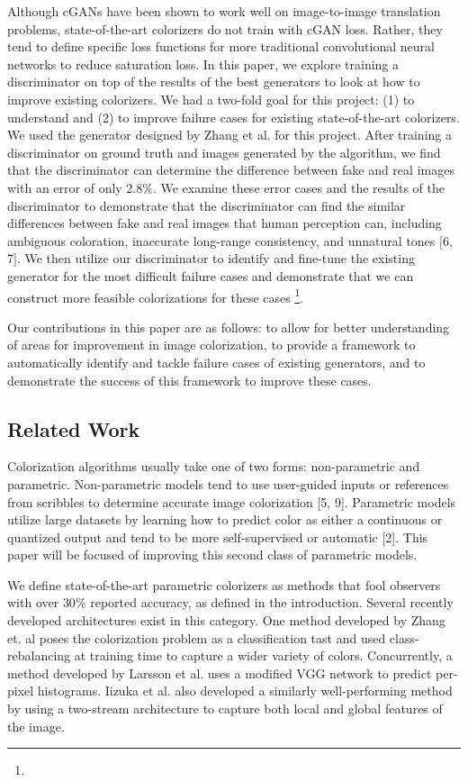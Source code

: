 \documentclass[10pt,twocolumn,letterpaper]{article}
\begin{document}
Although cGANs have been shown to work well on image-to-image translation problems, state-of-the-art colorizers do not train with cGAN loss. Rather, they tend to define specific loss functions for more traditional convolutional neural networks to reduce saturation loss. In this paper, we explore training a discriminator on top of the results of the best generators to look at how to improve existing colorizers. We had a two-fold goal for this project: (1) to understand and (2) to improve failure cases for existing state-of-the-art colorizers. We used the generator designed by Zhang et al. for this project. After training a discriminator on ground truth and images generated by the algorithm, we find that the discriminator can determine the difference between fake and real images with an error of only $2.8\%$. We examine these error cases and the results of the discriminator to demonstrate that the discriminator can find the similar differences between fake and real images that human perception can, including ambiguous coloration, inaccurate long-range consistency, and unnatural tones [6, 7]. We then utilize our discriminator to identify and fine-tune the existing generator for the most difficult failure cases and demonstrate that we can construct more feasible colorizations for these cases \footnote{}.

Our contributions in this paper are as follows: to allow for better understanding of areas for improvement in image colorization, to provide a framework to automatically identify and tackle failure cases of existing generators, and to demonstrate the success of this framework to improve these cases. 

\subsection{Related Work}

Colorization algorithms usually take one of two forms: non-parametric and parametric. Non-parametric models tend to use user-guided inputs or references from scribbles to determine accurate image colorization [5, 9]. Parametric models utilize large datasets by learning how to predict color as either a continuous or quantized output and tend to be more self-supervised or automatic [2]. This paper will be focused of improving this second class of parametric models.

We define state-of-the-art parametric colorizers as methods that fool observers with over $30\%$ reported accuracy, as defined in the introduction. Several recently developed architectures exist in this category. One method developed by Zhang et. al poses the colorization problem as a classification tast and used class-rebalancing at training time to capture a wider variety of colors. Concurrently, a method developed by Larsson et al. uses a modified VGG network to predict per-pixel histograms. Iizuka et al. also developed a similarly well-performing method by using a two-stream architecture to capture both local and global features of the image.
\end{document}
